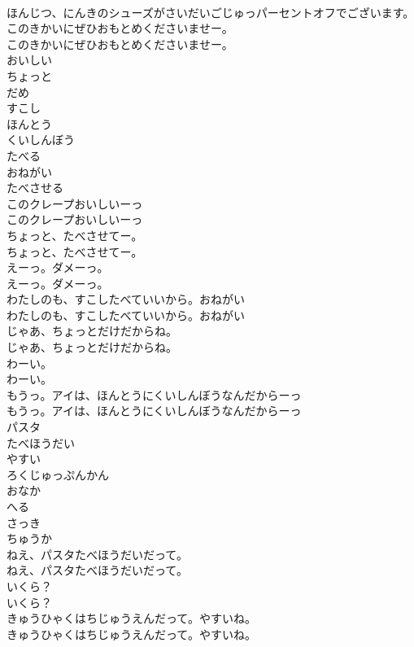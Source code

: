 \documentclass[8pt]{extreport}
\begin{document}
\begin{CJK}{UTF8}{min}
\\	ほんじつ、にんきのシューズがさいだいごじゅっパーセントオフでございます。
\\	このきかいにぜひおもとめくださいませー。
\\	このきかいにぜひおもとめくださいませー。
\\	おいしい
\\	ちょっと
\\	だめ
\\	すこし
\\	ほんとう
\\	くいしんぼう
\\	たべる
\\	おねがい
\\	たべさせる
\\	このクレープおいしいーっ
\\	このクレープおいしいーっ
\\	ちょっと、たべさせてー。
\\	ちょっと、たべさせてー。
\\	えーっ。ダメーっ。
\\	えーっ。ダメーっ。
\\	わたしのも、すこしたべていいから。おねがい
\\	わたしのも、すこしたべていいから。おねがい
\\	じゃあ、ちょっとだけだからね。
\\	じゃあ、ちょっとだけだからね。
\\	わーい。
\\	わーい。
\\	もうっ。アイは、ほんとうにくいしんぼうなんだからーっ
\\	もうっ。アイは、ほんとうにくいしんぼうなんだからーっ
\\	パスタ
\\	たべほうだい
\\	やすい
\\	ろくじゅっぷんかん
\\	おなか
\\	へる
\\	さっき
\\	ちゅうか
\\	ねえ、パスタたべほうだいだって。
\\	ねえ、パスタたべほうだいだって。
\\	いくら？
\\	いくら？
\\	きゅうひゃくはちじゅうえんだって。やすいね。
\\	きゅうひゃくはちじゅうえんだって。やすいね。

\end{CJK}
\end{document}
